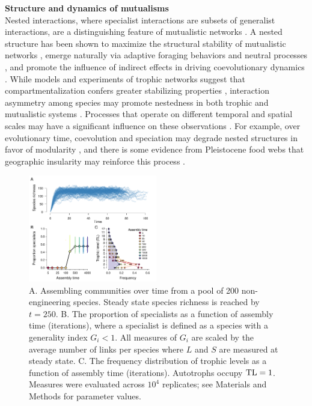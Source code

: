 \documentclass[9pt,twocolumn,twoside]{pnas-new}
\begin{document}
\vspace{-3mm}
\noindent \textbf{Structure and dynamics of mutualisms}\\
Nested interactions, where specialist interactions are subsets of generalist interactions, are a distinguishing feature of mutualistic networks \cite{Bascompte2003}.
A nested structure has been shown to maximize the structural stability of mutualistic networks \cite{Rohr2014}, emerge naturally via adaptive foraging behaviors \cite{Valdovinos2016,Valdovinos2019} and neutral processes \cite{Krishna2008}, and promote the influence of indirect effects in driving coevolutionary dynamics \cite{Guimaraes2017}.
While models and experiments of trophic networks suggest that compartmentalization confers greater stabilizing properties \cite{Stouffer2011,Gilarranz2017}, interaction asymmetry among species may promote nestedness in both trophic \cite{Araujo2010} and mutualistic systems \cite{Pires2011}.
Processes that operate on different temporal and spatial scales may have a significant influence on these observations \cite{Massol2011}.
For example, over evolutionary time, coevolution and speciation may degrade nested structures in favor of modularity \cite{Ponisio2019}, and there is some evidence from Pleistocene food webs that geographic insularity may reinforce this process \cite{Yeakel2013}.

\vspace{-4mm}
\begin{figure}[h!]
\centering
\includegraphics[width=0.5\textwidth]{fig_trophic2.pdf}
\vspace{-6mm}
\caption{
A. Assembling communities over time from a pool of 200 non-engineering species. 
Steady state species richness is reached by $t=250$.
B. The proportion of specialists as a function of assembly time (iterations), where a specialist is defined as a species with a generality index $G_i < 1$.
All measures of $G_i$ are scaled by the average number of links per species where $L$ and $S$ are measured at steady state.
C. The frequency distribution of trophic levels as a function of assembly time (iterations). 
Autotrophs occupy ${\rm TL}=1$.
Measures were evaluated across $10^4$ replicates; see Materials and Methods for parameter values.
\vspace{-3mm}
}
\label{fig:trophic}
\end{figure}
\end{document}
